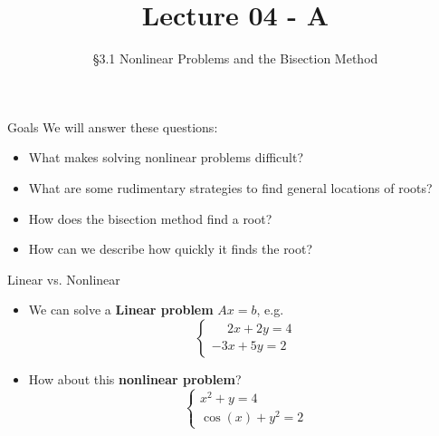 \documentclass[10pt]{beamer}
\title[Math/CS 375]{Lecture 04 - A}
\subtitle{\S 3.1 Nonlinear Problems and the Bisection Method}
\begin{document}
\begin{frame}
  \titlepage
\end{frame}
\begin{frame}{Goals}
We will answer these questions:\\[3mm]
\begin{itemize}
    \item What makes solving nonlinear problems difficult? 
    \item What are some rudimentary strategies to find general locations of roots?
    \item How does the bisection method find a root? 
    \item How can we describe how quickly it finds the root?
\end{itemize}
\end{frame}
\begin{frame}{Linear vs. Nonlinear}
\begin{itemize}
    \item We can solve a \textbf{Linear problem} $Ax=b$, e.g.
    \begin{equation}
    \begin{cases}
    \phantom{-}2x + 2y = 4 \\
    -3x + 5y = 2
    \end{cases}
    \end{equation}
    \item How about this \textbf{nonlinear problem}? 
    \begin{equation}
    \begin{cases}
    x^2 + y = 4 \\
    \cos(x) + y^2 = 2
    \end{cases}
    \end{equation}

\end{itemize}
\end{frame}
\end{document}
